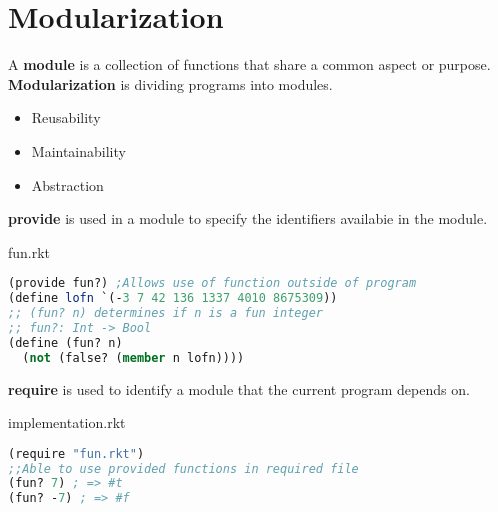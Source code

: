 \documentclass[english, 12pt]{article}
\begin{document}
\notesheader

\section{Modularization}
\begin{defn}
A \textbf{module} is a collection of functions that share a common aspect or purpose. \textbf{Modularization} is dividing programs into modules.
\begin{itemize}
\item Reusability
\item Maintainability
\item Abstraction
\end{itemize}
\end{defn}
\begin{defn}
\textbf{provide} is used in a module to specify the identifiers availabie in the module.
\end{defn}
fun.rkt
\begin{lstlisting}[language=Scheme]
(provide fun?) ;Allows use of function outside of program
(define lofn `(-3 7 42 136 1337 4010 8675309))
;; (fun? n) determines if n is a fun integer
;; fun?: Int -> Bool
(define (fun? n)
  (not (false? (member n lofn))))
\end{lstlisting}
\begin{defn}
\textbf{require} is used to identify a module that the current program depends on.
\end{defn}
implementation.rkt
\begin{lstlisting}[language=Scheme]
(require "fun.rkt")
;;Able to use provided functions in required file
(fun? 7) ; => #t
(fun? -7) ; => #f
\end{lstlisting}
\end{document}
